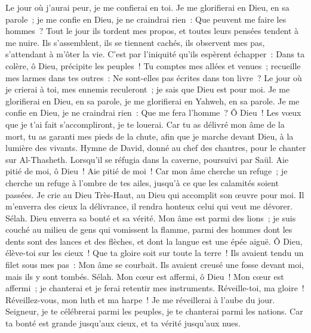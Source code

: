 \begin{multicols}{2}
Le jour où j'aurai peur, je me confierai en toi.
Je me glorifierai en Dieu, en sa parole~; je me confie en Dieu, je ne craindrai rien~: Que peuvent me faire les hommes~?
Tout le jour ils tordent mes propos, et toutes leurs pensées tendent à me nuire.
Ils s'assemblent, ils se tiennent cachés, ils observent mes pas, s'attendant à m'ôter la vie.
C'est par l'iniquité qu'ils espèrent échapper~: Dans ta colère, ô Dieu, précipite les peuples~!
Tu comptes mes allées et venues~; recueille mes larmes dans tes outres~: Ne sont-elles pas écrites dans ton livre~?
Le jour où je crierai à toi, mes ennemis reculeront~; je sais que Dieu est pour moi.
Je me glorifierai en Dieu, en sa parole, je me glorifierai en Yahweh, en sa parole.
Je me confie en Dieu, je ne craindrai rien~: Que me fera l'homme~?
Ô Dieu~! Les vœux que je t'ai fait s'accompliront, je te louerai.
Car tu as délivré mon âme de la mort, tu as garanti mes pieds de la chute, afin que je marche devant Dieu, à la lumière des vivants.
\VerseOne{}Hymne de David, donné au chef des chantres, pour le chanter sur Al-Thasheth. Lorsqu'il se réfugia dans la caverne, poursuivi par Saül.
Aie pitié de moi, ô Dieu~! Aie pitié de moi~! Car mon âme cherche un refuge~; je cherche un refuge à l'ombre de tes ailes, jusqu'à ce que les calamités soient passées.
Je crie au Dieu Très-Haut, au Dieu qui accomplit son œuvre pour moi.
Il m'enverra des cieux la délivrance, il rendra honteux celui qui veut me dévorer. Sélah. Dieu enverra sa bonté et sa vérité.
Mon âme est parmi des lions~; je suis couché au milieu de gens qui vomissent la flamme, parmi des hommes dont les dents sont des lances et des flèches, et dont la langue est une épée aiguë.
Ô Dieu, élève-toi sur les cieux~! Que ta gloire soit sur toute la terre~!
Ils avaient tendu un filet sous mes pas~: Mon âme se courbait. Ils avaient creusé une fosse devant moi, mais ils y sont tombés. Sélah.
Mon cœur est affermi, ô Dieu~! Mon cœur est affermi~; je chanterai et je ferai retentir mes instruments.
Réveille-toi, ma gloire~! Réveillez-vous, mon luth et ma harpe~! Je me réveillerai à l'aube du jour.
Seigneur, je te célébrerai parmi les peuples, je te chanterai parmi les nations.
Car ta bonté est grande jusqu'aux cieux, et ta vérité jusqu'aux nues.

\end{multicols}
